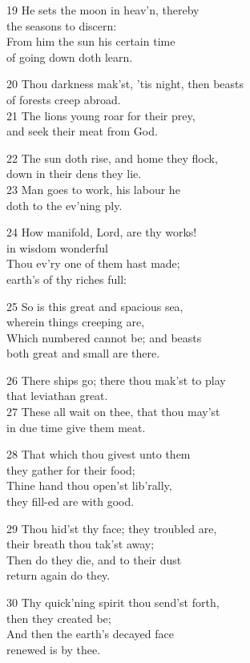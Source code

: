 19 He sets the moon in heav’n, thereby\\
the seasons to discern:\\
From him the sun his certain time\\
of going down doth learn.

20 Thou darkness mak’st, ’tis night, then beasts\\
of forests creep abroad.\\
21 The lions young roar for their prey,\\
and seek their meat from God.

22 The sun doth rise, and home they flock,\\
down in their dens they lie.\\
23 Man goes to work, his labour he\\
doth to the ev’ning ply.

24 How manifold, Lord, are thy works!\\
in wisdom wonderful\\
Thou ev’ry one of them hast made;\\
earth’s of thy riches full:

25 So is this great and spacious sea,\\
wherein things creeping are,\\
Which numbered cannot be; and beasts\\
both great and small are there.

26 There ships go; there thou mak’st to play\\
that leviathan great.\\
27 These all wait on thee, that thou may’st\\
in due time give them meat.

28 That which thou givest unto them\\
they gather for their food;\\
Thine hand thou open’st lib’rally,\\
they fill-ed are with good.

29 Thou hid’st thy face; they troubled are,\\
their breath thou tak’st away;\\
Then do they die, and to their dust\\
return again do they.

30 Thy quick’ning spirit thou send’st forth,\\
then they created be;\\
And then the earth’s decayed face\\
renewed is by thee.

